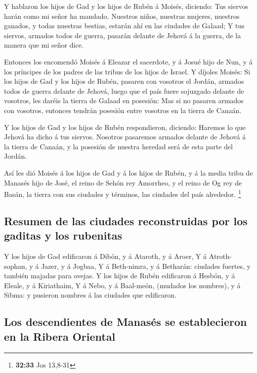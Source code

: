  Y hablaron los hijos de Gad y los hijos de Rubén á Moisés,
diciendo: Tus siervos harán como mi señor ha mandado. 
Nuestros niños, nuestras mujeres, nuestros ganados, y todas nuestras
bestias, estarán ahí en las ciudades de Galaad;  Y tus
siervos, armados todos de guerra, pasarán delante de Jehová á la guerra,
de la manera que mi señor dice.

 Entonces los encomendó Moisés á Eleazar el sacerdote, y á
Josué hijo de Nun, y á los príncipes de los padres de las tribus de los
hijos de Israel.  Y díjoles Moisés: Si los hijos de Gad y
los hijos de Rubén, pasaren con vosotros el Jordán, armados todos de
guerra delante de Jehová, luego que el país fuere sojuzgado delante de
vosotros, les daréis la tierra de Galaad en posesión:  Mas
si no pasaren armados con vosotros, entonces tendrán posesión entre
vosotros en la tierra de Canaán.

 Y los hijos de Gad y los hijos de Rubén respondieron,
diciendo: Haremos lo que Jehová ha dicho á tus siervos. 
Nosotros pasaremos armados delante de Jehová á la tierra de Canaán, y la
posesión de nuestra heredad será de esta parte del Jordán.

 Así les dió Moisés á los hijos de Gad y á los hijos de
Rubén, y á la media tribu de Manasés hijo de José, el reino de Sehón rey
Amorrheo, y el reino de Og rey de Basán, la tierra con sus ciudades y
términos, las ciudades del país alrededor. \footnote{\textbf{32:33} Jos
  13,8-31}

\hypertarget{resumen-de-las-ciudades-reconstruidas-por-los-gaditas-y-los-rubenitas}{%
\subsection{Resumen de las ciudades reconstruidas por los gaditas y los
rubenitas}\label{resumen-de-las-ciudades-reconstruidas-por-los-gaditas-y-los-rubenitas}}

 Y los hijos de Gad edificaron á Dibón, y á Ataroth, y á
Aroer,  Y á Atroth-sophan, y á Jazer, y á Jogbaa,
 Y á Beth-nimra, y á Betharán: ciudades fuertes, y también
majadas para ovejas.  Y los hijos de Rubén edificaron á
Hesbón, y á Eleale, y á Kiriathaim,  Y á Nebo, y á
Baal-meón, (mudados los nombres), y á Sibma: y pusieron nombres á las
ciudades que edificaron.

\hypertarget{los-descendientes-de-manasuxe9s-se-establecieron-en-la-ribera-oriental}{%
\subsection{Los descendientes de Manasés se establecieron en la Ribera
Oriental}\label{los-descendientes-de-manasuxe9s-se-establecieron-en-la-ribera-oriental}}

